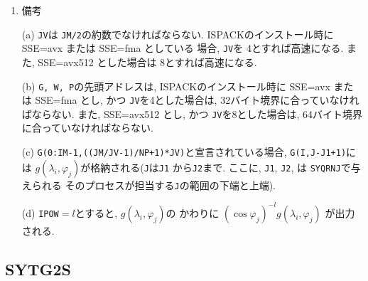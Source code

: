 \documentclass[a4j]{jsarticle}
\begin{document}
\begin{enumerate}
\item 備考

(a) \texttt{JV}は \texttt{JM/2}の約数でなければならない.
ISPACKのインストール時に SSE=avx または SSE=fma としている
場合, \texttt{JV}を 4とすれば高速になる.
また, SSE=avx512 とした場合は 8とすれば高速になる.
  
(b) \texttt{G, W, P}の先頭アドレスは, 
ISPACKのインストール時に SSE=avx または SSE=fma とし, かつ
\texttt{JV}を4とした場合は, 32バイト境界に合っていなければならない.
また, SSE=avx512 とし, かつ
\texttt{JV}を8とした場合は, 64バイト境界に合っていなければならない.

(c) \texttt{G(0:IM-1,((JM/JV-1)/NP+1)*JV)}と宣言されている場合, 
    \texttt{G(I,J-J1+1)}には
    $g(\lambda_i,\varphi_j)$が格納される(\texttt{J}は\texttt{J1}
    から\texttt{J2}まで.
    ここに, \texttt{J1}, \texttt{J2}, は \texttt{SYQRNJ}で与えられる
    そのプロセスが担当する\texttt{J}の範囲の下端と上端).

(d) \texttt{IPOW}$=l$とすると, $g(\lambda_i,\varphi_j)$の
    かわりに $(\cos\varphi_j)^{-l}g(\lambda_i,\varphi_j)$ が出力される.

\end{enumerate}


\subsection{SYTG2S}
\end{document}
